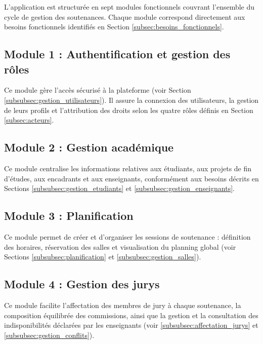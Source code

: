 \documentclass[12pt,a4paper]{article}
\begin{document}
\label{sec:modules}

L'application est structurée en sept modules fonctionnels couvrant l'ensemble du
cycle de gestion des soutenances. Chaque module correspond directement aux besoins
fonctionnels identifiés en Section \ref{subsec:besoins_fonctionnels}.

\subsection{Module 1 : Authentification et gestion des rôles}
\label{subsec:module_auth}

Ce module gère l'accès sécurisé à la plateforme (voir Section
\ref{subsubsec:gestion_utilisateurs}). Il assure la connexion des utilisateurs,
la gestion de leurs profils et l'attribution des droits selon les quatre rôles
définis en Section \ref{subsec:acteurs}.

\subsection{Module 2 : Gestion académique}
\label{subsec:module_academique}

Ce module centralise les informations relatives aux étudiants, aux projets de
fin d'études, aux encadrants et aux enseignants, conformément aux besoins décrits
en Sections \ref{subsubsec:gestion_etudiants} et \ref{subsubsec:gestion_enseignants}.

\subsection{Module 3 : Planification}
\label{subsec:module_planification}

Ce module permet de créer et d'organiser les sessions de soutenance : définition
des horaires, réservation des salles et visualisation du planning global (voir
Sections \ref{subsubsec:planification} et \ref{subsubsec:gestion_salles}).

\subsection{Module 4 : Gestion des jurys}
\label{subsec:module_jurys}

Ce module facilite l'affectation des membres de jury à chaque soutenance, la
composition équilibrée des commissions, ainsi que la gestion et la consultation
des indisponibilités déclarées par les enseignants (voir
\ref{subsubsec:affectation_jurys} et \ref{subsubsec:gestion_conflits}).
\end{document}
